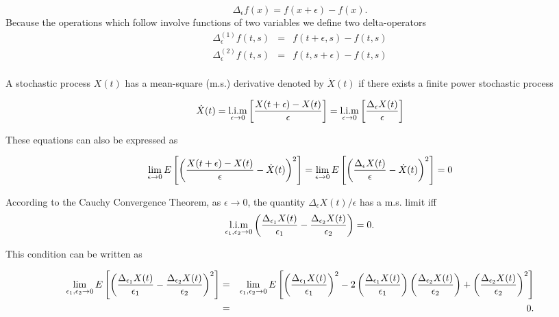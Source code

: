 $$\Delta_\epsilon f(x)  = f(x+\epsilon) - f(x).$$ Because the operations which follow involve functions of two variables we define two delta-operators
\begin{eqnarray*}
\Delta_\epsilon^{(1)} f(t,s) &=& f(t+\epsilon, s) - f(t,s) \\ 
\Delta_\epsilon^{(2)} f(t,s) &=& f(t, s +\epsilon) - f(t,s) \\ 
\end{eqnarray*}

A stochastic process $X(t)$ has a mean-square (m.s.) derivative denoted by $\dot{X}(t)$ if there exists a finite power stochastic process

\[\dot{X}(t) = \mslim_{\epsilon\to0} \left[ {X(t+\epsilon) - X(t) \over \epsilon}  \right] =\mslim_{\epsilon\to0}\left[ {\Delta_\epsilon X(t)\over \epsilon} \right]    \] 

These equations can also be expressed as

\[ \lim_{\epsilon\to0} E \left[ \left( {X(t+\epsilon) - X(t) \over \epsilon} - \dot{X}(t) \right)^2 \right] =\lim_{\epsilon\to0}E\left[ \left( {\Delta_\epsilon X(t)\over \epsilon} - \dot{X}(t) \right)^2 \right] = 0 \] 

According to the Cauchy Convergence Theorem, as $\epsilon\to0$, the quantity $\Delta_\epsilon X(t) / \epsilon$ has a m.s. limit iff
\[ \mslim_{\epsilon_1, \epsilon_2\to 0} \left({\Delta_{\epsilon_1} X(t)\over \epsilon_1}   - {\Delta_{\epsilon_2} X(t)\over \epsilon_2}   \right) = 0.  \]
 
This condition can be written as 

\begin{eqnarray*} 
\lim_{\epsilon_1, \epsilon_2\to 0}E\left[ \left({\Delta_{\epsilon_1} X(t)\over \epsilon_1}   - {\Delta_{\epsilon_2} X(t)\over \epsilon_2}   \right)^2\right] &=&
\lim_{\epsilon_1, \epsilon_2\to 0}E\left[ \left({\Delta_{\epsilon_1} X(t)\over \epsilon_1}\right)^2   - 2\left({\Delta_{\epsilon_1} X(t)\over \epsilon_1}\right) \left( {\Delta_{\epsilon_2} X(t)\over \epsilon_2}   \right)
+ \left({\Delta_{\epsilon_2} X(t)\over \epsilon_2}\right)^2\right] \\ 
&=& 0.
\end{eqnarray*}

